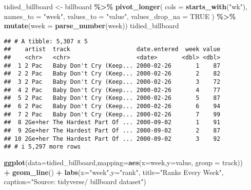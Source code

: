 \documentclass[
]{article}
\newenvironment{Shaded}{\begin{snugshade}}{\end{snugshade}}
\newcommand{\AttributeTok}[1]{\textcolor[rgb]{0.13,0.29,0.53}{#1}}
\newcommand{\ConstantTok}[1]{\textcolor[rgb]{0.56,0.35,0.01}{#1}}
\newcommand{\FunctionTok}[1]{\textcolor[rgb]{0.13,0.29,0.53}{\textbf{#1}}}
\newcommand{\NormalTok}[1]{#1}
\newcommand{\OtherTok}[1]{\textcolor[rgb]{0.56,0.35,0.01}{#1}}
\newcommand{\SpecialCharTok}[1]{\textcolor[rgb]{0.81,0.36,0.00}{\textbf{#1}}}
\newcommand{\StringTok}[1]{\textcolor[rgb]{0.31,0.60,0.02}{#1}}
\begin{document}
\begin{Shaded}
\begin{Highlighting}[]
\NormalTok{tidied\_billboard }\OtherTok{\textless{}{-}}\NormalTok{ billboard }\SpecialCharTok{\%\textgreater{}\%}
\FunctionTok{pivot\_longer}\NormalTok{(}
\AttributeTok{cols =} \FunctionTok{starts\_with}\NormalTok{(}\StringTok{"wk"}\NormalTok{),}
\AttributeTok{names\_to =} \StringTok{"week"}\NormalTok{,}
\AttributeTok{values\_to =} \StringTok{"value"}\NormalTok{,}
\AttributeTok{values\_drop\_na =} \ConstantTok{TRUE}
\NormalTok{) }\SpecialCharTok{\%\textgreater{}\%}
\FunctionTok{mutate}\NormalTok{(}\AttributeTok{week =} \FunctionTok{parse\_number}\NormalTok{(week))}
\NormalTok{tidied\_billboard}
\end{Highlighting}
\end{Shaded}

\begin{verbatim}
## # A tibble: 5,307 x 5
##    artist  track                   date.entered  week value
##    <chr>   <chr>                   <date>       <dbl> <dbl>
##  1 2 Pac   Baby Don't Cry (Keep... 2000-02-26       1    87
##  2 2 Pac   Baby Don't Cry (Keep... 2000-02-26       2    82
##  3 2 Pac   Baby Don't Cry (Keep... 2000-02-26       3    72
##  4 2 Pac   Baby Don't Cry (Keep... 2000-02-26       4    77
##  5 2 Pac   Baby Don't Cry (Keep... 2000-02-26       5    87
##  6 2 Pac   Baby Don't Cry (Keep... 2000-02-26       6    94
##  7 2 Pac   Baby Don't Cry (Keep... 2000-02-26       7    99
##  8 2Ge+her The Hardest Part Of ... 2000-09-02       1    91
##  9 2Ge+her The Hardest Part Of ... 2000-09-02       2    87
## 10 2Ge+her The Hardest Part Of ... 2000-09-02       3    92
## # i 5,297 more rows
\end{verbatim}

\begin{Shaded}
\begin{Highlighting}[]
\FunctionTok{ggplot}\NormalTok{(}\AttributeTok{data=}\NormalTok{tidied\_billboard,}\AttributeTok{mapping=}\FunctionTok{aes}\NormalTok{(}\AttributeTok{x=}\NormalTok{week,}\AttributeTok{y=}\NormalTok{value, }\AttributeTok{group =}\NormalTok{ track)) }\SpecialCharTok{+} 
  \FunctionTok{geom\_line}\NormalTok{() }\SpecialCharTok{+} 
  \FunctionTok{labs}\NormalTok{(}\AttributeTok{x=}\StringTok{"week"}\NormalTok{,}\AttributeTok{y=}\StringTok{"rank"}\NormalTok{, }
\AttributeTok{title=}\StringTok{"Ranks Every Week"}\NormalTok{, }
\AttributeTok{caption=}\StringTok{"Source: tidyverse/ billboard dataset"}\NormalTok{)}
\end{Highlighting}
\end{Shaded}
\end{document}
